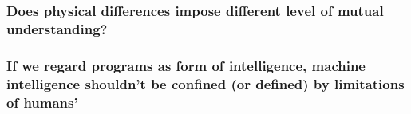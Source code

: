 \documentclass[11pt]{article}
\begin{document}
\subsubsection{Does physical differences impose different level of mutual understanding?}

\subsubsection{If we regard programs as form of intelligence, machine intelligence shouldn't be confined (or defined) by limitations of humans'}




\end{document}
